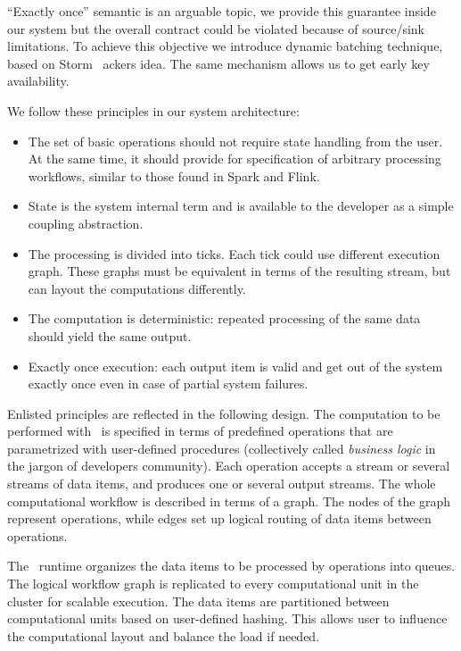 ``Exactly once'' semantic is an arguable topic, we provide this guarantee inside our system but the overall contract could be violated because of source/sink limitations. To achieve this objective we introduce dynamic batching technique, based on Storm~\cite{apache:storm} ackers idea. The same mechanism allows us to get early key availability.

We follow these principles in our system architecture:
\begin{itemize}
\item The set of basic operations should not require state handling from the user. At the same time, it should provide for specification of arbitrary processing workflows, similar to those found in Spark and Flink.
\item State is the system internal term and is available to the developer as a simple coupling abstraction.
\item The processing is divided into ticks. Each tick could use different execution graph. These graphs must be equivalent in terms of the resulting stream, but can layout the computations differently.
\item The computation is deterministic: repeated processing of the same data should yield the same output.
\item Exactly once execution: each output item is valid and get out of the system exactly once even in case of partial system failures.
\end{itemize}

Enlisted principles are reflected in the following design. The computation to be performed with \FlameStream\ is specified in terms of predefined operations that are parametrized with user-defined procedures (collectively called {\em business logic} in the jargon of developers community). Each operation accepts a stream or several streams of data items, and produces one or several output streams. The whole computational workflow is described in terms of a graph. The nodes of the graph represent operations, while edges set up logical routing of data items between operations.

The \FlameStream\ runtime organizes the data items to be processed by operations into queues. The logical workflow graph is replicated to every computational unit in the cluster for scalable execution. The data items are partitioned between computational units based on user-defined hashing. This allows user to influence the computational layout and balance the load if needed.

